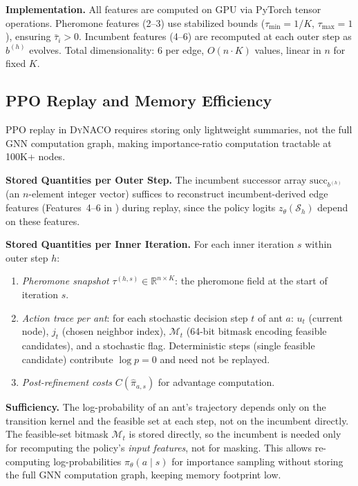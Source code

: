 \documentclass[sigconf,review]{acmart}
\newcommand{\DyNACO}{\textsc{DyNACO}}
\begin{document}
\textbf{Implementation.}
All features are computed on GPU via PyTorch tensor operations.
Pheromone features (2--3) use stabilized bounds ($\tau_{\min}=1/K$, $\tau_{\max}=1$), ensuring $\bar{\tau}_i > 0$.
Incumbent features (4--6) are recomputed at each outer step as $b^{(h)}$ evolves.
Total dimensionality: 6 per edge, $O(n \cdot K)$ values, linear in $n$ for fixed $K$.



\subsection{PPO Replay and Memory Efficiency}
\label{app:ppo-replay}

PPO replay in \DyNACO{} requires storing only lightweight summaries, not the full GNN computation graph, making importance-ratio computation tractable at 100K+ nodes.

\textbf{Stored Quantities per Outer Step.}
The incumbent successor array $\mathrm{succ}_{b^{(h)}}$ (an $n$-element integer vector) suffices to reconstruct incumbent-derived edge features (Features~4--6 in ) during replay, since the policy logits $z_\theta(\mathcal{S}_h)$ depend on these features.

\textbf{Stored Quantities per Inner Iteration.}
For each inner iteration $s$ within outer step $h$:
\begin{enumerate}
\item \emph{Pheromone snapshot} $\tau^{(h,s)} \in \mathbb{R}^{n \times K}$: the pheromone field at the start of iteration $s$.
\item \emph{Action trace per ant}: for each stochastic decision step $t$ of ant $a$:
  $u_t$ (current node), $j_t$ (chosen neighbor index), $\mathcal{M}_t$ (64-bit bitmask encoding feasible candidates), and a stochastic flag.
  Deterministic steps (single feasible candidate) contribute $\log p = 0$ and need not be replayed.
\item \emph{Post-refinement costs} $C(\hat{\pi}_{a,s})$ for advantage computation.
\end{enumerate}

\textbf{Sufficiency.}
The log-probability of an ant's trajectory depends only on the transition kernel and the feasible set at each step, not on the incumbent directly.
The feasible-set bitmask $\mathcal{M}_t$ is stored directly, so the incumbent is needed only for recomputing the policy's \emph{input features}, not for masking.
This allows re-computing log-probabilities $\pi_\theta(a \mid s)$ for importance sampling without storing the full GNN computation graph, keeping memory footprint low.
\end{document}
